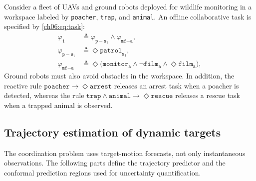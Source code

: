 
\begin{example}
\label{ch06:exp:task}

Consider a fleet of UAVs and ground robots deployed for wildlife
monitoring in a workspace labeled by \texttt{poacher}, \texttt{trap},
and \texttt{animal}. An offline collaborative task is specified by
\eqref{ch06:eq:task}:
\begin{equation}
\label{ch06:eq:task}
\begin{aligned}
\varphi_{\texttt{1}}
&\triangleq
\varphi_{\texttt{p}-\texttt{s}_1}
\wedge
\varphi_{\texttt{mf}-\texttt{a}}, \\
\varphi_{\texttt{p}-\texttt{s}_1}
&\triangleq
\Diamond \texttt{patrol}_{\texttt{s}_1}, \\
\varphi_{\texttt{mf}-\texttt{a}}
&\triangleq
\Diamond\bigl(
\texttt{monitor}_{\texttt{a}}
\wedge
\neg \texttt{film}_{\texttt{a}}
\wedge
\Diamond \texttt{film}_{\texttt{a}}
\bigr),
\end{aligned}
\end{equation}
 Ground robots must also avoid
obstacles in the workspace. In addition, the reactive rule
$\texttt{poacher} \rightarrow \Diamond \texttt{arrest}$ releases an
arrest task when a poacher is detected, whereas the rule
$\texttt{trap} \wedge \texttt{animal} \rightarrow
\Diamond \texttt{rescue}$ releases a rescue task when a trapped animal
is observed.
\end{example}


\subsection{Trajectory estimation of dynamic targets}
\label{ch06:subsec:trajectory}

The coordination problem uses target-motion forecasts, not only instantaneous
observations. The following parts define the trajectory predictor and the
conformal prediction regions used for uncertainty quantification.

